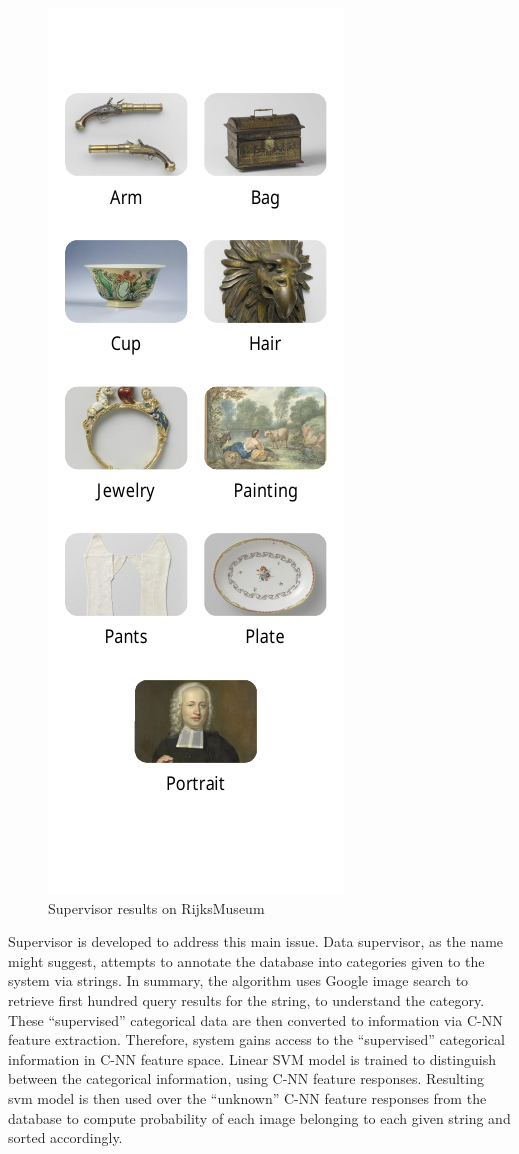 \documentclass[runningheads]{llncs}
\begin{document}
\begin{figure}
	\includegraphics{data_supervisor}
	\caption{Supervisor results on RijksMuseum}
	\label{fig-dsupervisor}	
\end{figure}

Supervisor is developed to address this main issue. Data supervisor, as the name might suggest, attempts to annotate the database into categories given to the system via strings. In summary, the algorithm uses Google image search\cite{googleImage} to retrieve first hundred query results for the string, to understand the category. These “supervised” categorical data are then converted to information via C-NN\cite{Chatfield14} feature extraction. Therefore, system gains access to the “supervised” categorical information in C-NN feature space. Linear SVM model is trained to distinguish between the categorical information, using C-NN feature responses. Resulting svm model is then used over the “unknown” C-NN feature responses from the database to compute probability of each image belonging to each given string and sorted accordingly.
\end{document}
